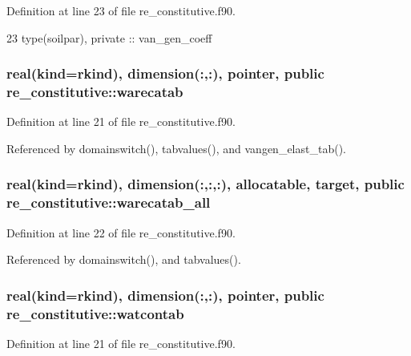 Definition at line 23 of file re\+\_\+constitutive.\+f90.


\begin{DoxyCode}
23   \textcolor{keywordtype}{type}(soilpar), \textcolor{keywordtype}{private} :: van_gen_coeff
\end{DoxyCode}
\subsubsection[{warecatab}]{\setlength{\rightskip}{0pt plus 5cm}real(kind=rkind), dimension(\+:,\+:), pointer, public re\+\_\+constitutive\+::warecatab}\label{namespacere__constitutive_a97cae19740749808642dcd2fb326ddb1}


Definition at line 21 of file re\+\_\+constitutive.\+f90.



Referenced by domainswitch(), tabvalues(), and vangen\+\_\+elast\+\_\+tab().

\subsubsection[{warecatab\+\_\+all}]{\setlength{\rightskip}{0pt plus 5cm}real(kind=rkind), dimension(\+:,\+:,\+:), allocatable, target, public re\+\_\+constitutive\+::warecatab\+\_\+all}\label{namespacere__constitutive_a5b2162aa59a163afc487ea11d76326d5}


Definition at line 22 of file re\+\_\+constitutive.\+f90.



Referenced by domainswitch(), and tabvalues().

\subsubsection[{watcontab}]{\setlength{\rightskip}{0pt plus 5cm}real(kind=rkind), dimension(\+:,\+:), pointer, public re\+\_\+constitutive\+::watcontab}\label{namespacere__constitutive_a3d4ff1bd9e37d274bb888db1d630ddbb}


Definition at line 21 of file re\+\_\+constitutive.\+f90.



